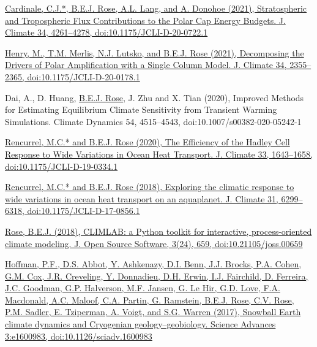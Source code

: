 \documentclass[11pt, letterpaper]{article} %
\newcommand{\years}[1]{\marginnote{\scriptsize #1}} %
\newcommand{\publink}{http://www.atmos.albany.edu/facstaff/brose/resources/Publications/}
\begin{document}
\href{\publink Cardinale_etal_JClim2021.pdf}{Cardinale, C.J.*, \underline{B.E.J. Rose}, A.L. Lang, and A. Donohoe (2021), Stratospheric and Tropospheric Flux Contributions to the Polar Cap Energy Budgets. J. Climate 34, 4261--4278, doi:10.1175/JCLI-D-20-0722.1}
\vspace{0.2 cm}

\href{\publink Henry_etal_JClim2021.pdf}{Henry, M., T.M. Merlis, N.J. Lutsko, and \underline{B.E.J. Rose} (2021), Decomposing the Drivers of Polar Amplification with a Single Column Model. J. Climate 34, 2355--2365, doi:10.1175/JCLI-D-20-0178.1}
\vspace{0.2 cm}

\years{2020} 
Dai, A., D. Huang, \underline{B.E.J. Rose}, J. Zhu and X. Tian (2020), Improved Methods for Estimating Equilibrium Climate Sensitivity from Transient Warming Simulations. Climate Dynamics 54, 4515--4543, doi:10.1007/s00382-020-05242-1
\vspace{0.2 cm}

\href{\publink Rencurrel_Rose_JClim2020.pdf}{Rencurrel, M.C.* and \underline{B.E.J. Rose} (2020), The Efficiency of the Hadley Cell Response to Wide Variations in Ocean Heat Transport. J. Climate 33, 1643--1658, doi:10.1175/JCLI-D-19-0334.1}
\vspace{0.2 cm}

\years{2018} 
\href{\publink Rencurrel_Rose_jcli-d-17-0856.1.pdf}{Rencurrel, M.C.* and \underline{B.E.J. Rose} (2018), Exploring the climatic response to wide variations in ocean heat transport on an aquaplanet. J. Climate 31, 6299--6318, doi:10.1175/JCLI-D-17-0856.1} 
\vspace{0.2 cm}

\href{\publink Rose_JOSS2018.pdf}{\underline{Rose, B.E.J.} (2018), CLIMLAB: a Python toolkit for interactive, process-oriented climate modeling. J. Open Source Software, 3(24), 659, doi:10.21105/joss.00659}
\vspace{0.2 cm}

\years{2017} 
\href{http://advances.sciencemag.org/content/3/11/e1600983}{Hoffman, P.F., D.S. Abbot, Y. Ashkenazy, D.I. Benn, J.J. Brocks, P.A. Cohen, G.M. Cox, J.R. Creveling, Y. Donnadieu, D.H. Erwin, I.J. Fairchild, D. Ferreira, J.C. Goodman, G.P. Halverson, M.F. Jansen, G. Le Hir, G.D. Love, F.A. Macdonald, A.C. Maloof, C.A. Partin, G. Ramstein, \underline{B.E.J. Rose}, C.V. Rose, P.M. Sadler, E. Tziperman, A. Voigt, and S.G. Warren (2017), Snowball Earth climate dynamics and Cryogenian geology--geobiology. Science Advances 3:e1600983, doi:10.1126/sciadv.1600983}
\vspace{0.2 cm}
\end{document}
